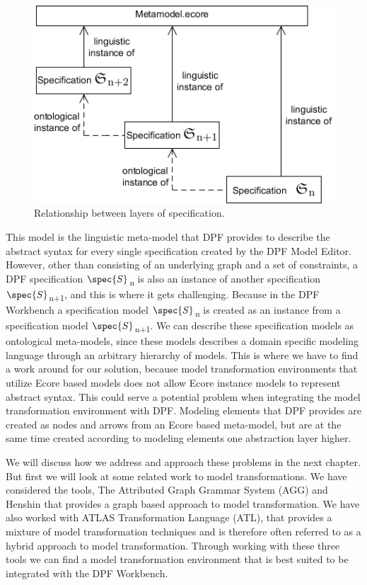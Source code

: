 \begin{figure}[H]
	\centering
	\includegraphics[scale=0.7]{./Figures/metamodelSpecification_1.png}
	\caption[Specification relationship with core meta-model]
	{Relationship between layers of specification.}
	\label{fig:core_metamodel}
\end{figure}

This model is the linguistic meta-model that DPF provides to describe the
abstract syntax for every single specification created by the DPF Model Editor.
However, other than consisting of an underlying graph and a set of constraints,
a DPF specification $\spec{S}$\textsubscript{n} is also an instance of another
specification$\spec{S}$\textsubscript{n+1}, and this is where it gets
challenging. Because in the DPF Workbench a specification model
$\spec{S}$\textsubscript{n} is created as an instance from a specification model
$\spec{S}$\textsubscript{n+1}. We can describe these specification models as
ontological meta-models, since these models describes a domain specific modeling
language through an arbitrary hierarchy of models. This is where we have to find
a work around for our solution, because model transformation environments that
utilize Ecore based models does not allow Ecore instance models to represent
abstract syntax. This could serve a potential problem when integrating the model
transformation environment with DPF. Modeling elements that DPF provides are
created as nodes and arrows from an Ecore based meta-model, but are at the same
time created according to modeling elements one abstraction layer higher.

We will discuss how we address and approach these problems in the next
chapter. But first we will look at some related work to model transformations.
We have considered the tools, The Attributed Graph Grammar
System\cite{Taentzer2004} (AGG) and Henshin\cite{Henshin_2010} that provides a
graph based approach to model transformation. We have also worked with ATLAS
Transformation Language\cite{ATL_USERMAN} (ATL), that provides a mixture of
model transformation techniques and is therefore often referred to as a hybrid
approach to model transformation. Through working with these three tools we can
find a model transformation environment that is best suited to be integrated
with the DPF Workbench.

